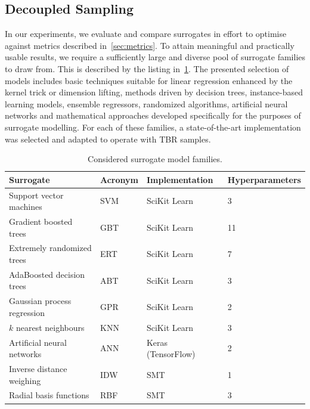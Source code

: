 \subsection{Decoupled Sampling}
\label{sec:supervised}

In our experiments, we evaluate and compare surrogates in effort to
optimise against metrics described in~\cref{sec:metrics}. To attain meaningful
and practically usable results, we require a sufficiently large and diverse pool
of surrogate families to draw from. This is described by the listing in~\cref{tbl:surrogates}. The presented selection of models includes basic
techniques suitable for linear regression enhanced by the kernel trick or dimension
lifting, methods driven by decision trees, instance-based learning models,
ensemble regressors, randomized algorithms, artificial neural networks and mathematical approaches
developed specifically for the purposes of surrogate modelling. For each of
these families, a state-of-the-art implementation was selected and adapted to
operate with TBR samples.

\begin{table}[h]
	\centering
	{\footnotesize
		\begin{tabular}{llll}
		\toprule
		Surrogate & Acronym & Implementation & Hyperparameters \\
		\midrule
		Support vector machines~\cite{fan2008liblinear}	& SVM & SciKit Learn~\cite{scikit-learn} & 3 \\
		Gradient boosted trees~\cite{friedman2001greedy,friedman1999stochastic,hastie2009elements}	& GBT & SciKit Learn & 11 \\
		Extremely randomized trees~\cite{geurts2006extremely}	& ERT & SciKit Learn & 7 \\
		AdaBoosted decision trees~\cite{drucker1997improving}	& ABT & SciKit Learn & 3 \\
		Gaussian process regression~\cite{williams2006gaussian}	& GPR & SciKit Learn & 2 \\
		$k$ nearest neighbours	& KNN & SciKit Learn & 3 \\
		Artificial neural networks	& ANN & Keras (TensorFlow)~\cite{chollet2015keras} & 2 \\
		Inverse distance weighing~\cite{shepard1968two} & IDW & SMT~\cite{SMT2019} & 1 \\
		Radial basis functions & RBF & SMT & 3 \\
		\bottomrule
		\end{tabular}
	}
	\caption{Considered surrogate model families.}
	\label{tbl:surrogates}
\end{table}

